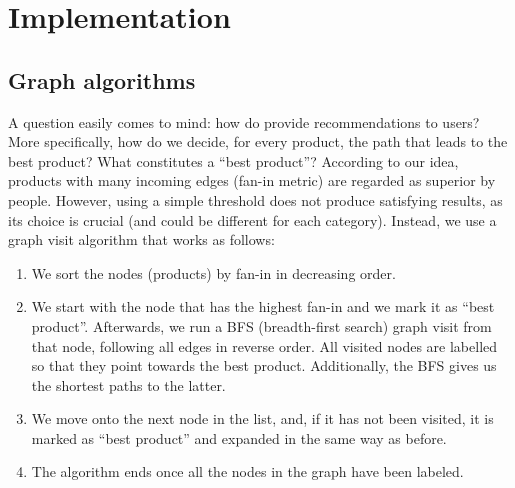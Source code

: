 \documentclass[a4paper,12pt]{article}
\begin{document}
\section{Implementation}


\subsection{Graph algorithms}
A question easily comes to mind: how do provide recommendations to users? More specifically, how do we decide, for every product, the path that leads to the best product? What constitutes a ``best product''?
According to our idea, products with many incoming edges (fan-in metric) are regarded as superior by people. However, using a simple threshold does not produce satisfying results, as its choice is crucial (and could be different for each category). Instead, we use a graph visit algorithm that works as follows:
\begin{enumerate}
	\item We sort the nodes (products) by fan-in in decreasing order.
	\item We start with the node that has the highest fan-in and we mark it as ``best product''. Afterwards, we run a BFS (breadth-first search) graph visit from that node, following all edges in reverse order. All visited nodes are labelled so that they point towards the best product. Additionally, the BFS gives us the shortest paths to the latter.
	\item We move onto the next node in the list, and, if it has not been visited, it is marked as ``best product'' and expanded in the same way as before.
	\item The algorithm ends once all the nodes in the graph have been labeled.
\end{enumerate}

\end{document}
